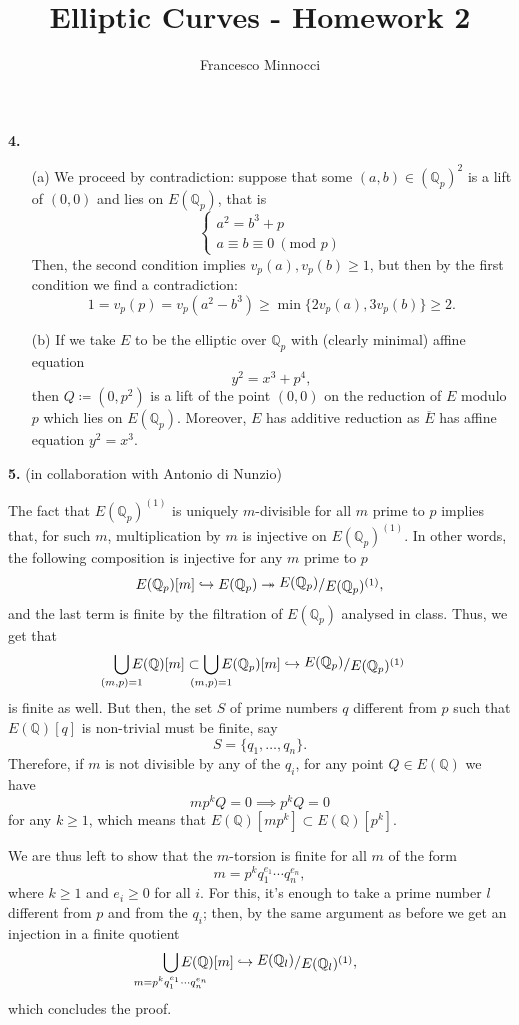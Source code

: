\documentclass[a4paper]{article}
\title{Elliptic Curves - Homework 2}
\author{Francesco Minnocci}
\newcommand{\Q}{\mathbb{Q}}
\newcommand{\Qp}{\Q_p}
\newcommand{\E}{E(\Qp)^{(1)}}
\newcommand{\ssfrac}[2]{
        \raisebox{+0.3ex}{$#1$}
        /
        \raisebox{-0.3ex}{$#2$}
}
\theoremstyle{definition}
\theoremstyle{definition}
\theoremstyle{remark}
\theoremstyle{definition}
\begin{document}
\maketitle

\textbf{4. }
\begin{itemize}
    \item[(a)] We proceed by contradiction: suppose that some $(a,b)\in(\Qp)^2$ is a lift of $(0,0)$ and lies on $E(\Qp)$, that is
        \[
            \begin{cases}
                a^2=b^3+p \\
                a\equiv b\equiv 0 ~(\text{mod } p)
            \end{cases}
        \]
        Then, the second condition implies $v_p(a),v_p(b)\geq 1$, but then by the first condition
        we find a contradiction:
        \[
            1=v_p(p)=v_p(a^2-b^3)\geq \min\{2v_p(a),3v_p(b)\}   \geq 2.
        \]

    \item[(b)] If we take $E$ to be the elliptic over $\Qp$ with (clearly minimal) affine equation
        \[
            y^2=x^3+p^4,
        \]
        then $Q\coloneqq (0,p^2)$ is a lift of the point $(0,0)$ on the reduction of $E$ modulo $p$ which lies on $E(\Qp)$. Moreover, $E$ has additive reduction as $\overline{E}$ has affine equation $y^2=x^3$.
\end{itemize}

\textbf{5. }(in collaboration with Antonio di Nunzio)

The fact that $\E$ is uniquely $m$-divisible for all $m$ prime to $p$ implies that, for such $m$, multiplication by $m$ is injective on $\E$.
In other words, the following composition is injective for any $m$ prime to $p$
\[
    E(\Qp)[m] \hookrightarrow E(\Qp) \twoheadrightarrow \ssfrac{E(\Qp)}{\E},
\]
and the last term is finite by the filtration of $E(\Qp)$ analysed in class. Thus, we get that
\[
    \bigcup_{\mathclap{{(m,p)=1}}} E(\Q)[m]\subset \bigcup_{\mathclap{{(m,p)=1}}} E(\Qp)[m] \hookrightarrow \ssfrac{E(\Qp)}{\E}
\]
is finite as well. But then, the set $S$ of prime numbers $q$ different from $p$ such that $E(\Q)[q]$ is non-trivial must be finite, say
\[
    S=\{q_1,\ldots,q_n\}.
\]
Therefore, if $m$ is not divisible by any of the $q_i$, for any point $Q\in E(\Q)$ we have
\[
    m p^k Q = 0 \implies p^k Q = 0
\]
for any $k\geq 1$, which means that $E(\Q)[m p^k]\subset E(\Q)[p^k]$.

We are thus left to show that the $m$-torsion is finite for all $m$ of the form \[m=p^k q_1^{e_1}\cdots q_n^{e_n},\] where $k\geq 1$ and $e_i\geq 0$ for all $i$. For this, it's enough to take a prime number $l$ different from $p$ and from the $q_i$; then, by the same argument as before we get an injection in a finite quotient
\[
    \bigcup_{\mathclap{m=p^k q_1^{e_1}\cdots q_n^{e_n}}}{E(\Q)[m]} \hookrightarrow \ssfrac{E(\Q_l)}{E(\Q_l)^{(1)}},
\]
which concludes the proof.
\end{document}
